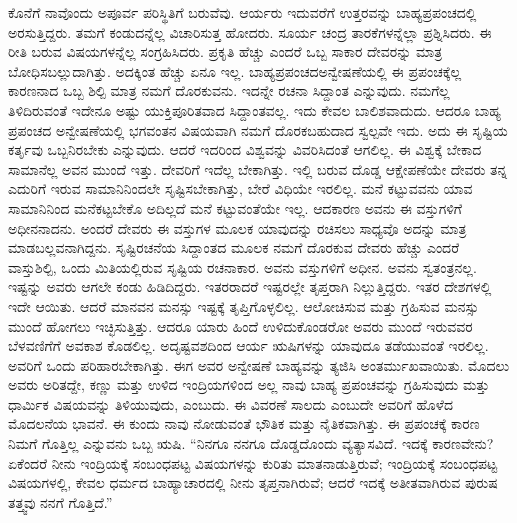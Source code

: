 ಕೊನೆಗೆ ನಾವೊಂದು ಅಪೂರ್ವ ಪರಿಸ್ಥಿತಿಗೆ ಬರುವೆವು. ಆರ್ಯರು ಇದುವರೆಗೆ ಉತ್ತರವನ್ನು ಬಾಹ್ಯಪ್ರಪಂಚದಲ್ಲಿ ಅರಸುತ್ತಿದ್ದರು. ತಮಗೆ ಕಂಡುದನ್ನೆಲ್ಲ ವಿಚಾರಿಸುತ್ತ ಹೋದರು. ಸೂರ್ಯ ಚಂದ್ರ ತಾರಕೆಗಳನ್ನೆಲ್ಲಾ ಪ್ರಶ್ನಿಸಿದರು. ಈ ರೀತಿ ಬರುವ ವಿಷಯಗಳನ್ನೆಲ್ಲ ಸಂಗ್ರಹಿಸಿದರು. ಪ್ರಕೃತಿ ಹೆಚ್ಚು ಎಂದರೆ ಒಬ್ಬ ಸಾಕಾರ ದೇವರನ್ನು ಮಾತ್ರ ಬೋಧಿಸಬಲ್ಲುದಾಗಿತ್ತು. ಅದಕ್ಕಿಂತ ಹೆಚ್ಚು ಏನೂ ಇಲ್ಲ. ಬಾಹ್ಯಪ್ರಪಂಚದ\break ಅನ್ವೇಷಣೆಯಲ್ಲಿ ಈ ಪ್ರಪಂಚಕ್ಕೆಲ್ಲ ಕಾರಣನಾದ ಒಬ್ಬ ಶಿಲ್ಪಿ ಮಾತ್ರ ನಮಗೆ ದೊರಕುವನು. ಇದನ್ನೇ ರಚನಾ ಸಿದ್ದಾಂತ ಎನ್ನುವುದು. ನಮಗೆಲ್ಲ ತಿಳಿದಿರುವಂತೆ ಇದೇನೂ ಅಷ್ಟು ಯುಕ್ತಿಪೂರಿತವಾದ ಸಿದ್ದಾಂತವಲ್ಲ. ಇದು ಕೇವಲ ಬಾಲಿಶವಾದುದು. ಆದರೂ ಬಾಹ್ಯ ಪ್ರಪಂಚದ ಅನ್ವೇಷಣೆಯಲ್ಲಿ ಭಗವಂತನ ವಿಷಯವಾಗಿ ನಮಗೆ ದೊರಕಬಹುದಾದ ಸ್ವಲ್ಪವೇ ಇದು. ಅದು ಈ ಸೃಷ್ಟಿಯ ಕರ್ತೃವು ಒಬ್ಬನಿರಬೇಕು ಎನ್ನುವುದು. ಆದರೆ ಇದರಿಂದ ವಿಶ್ವವನ್ನು ವಿವರಿಸಿದಂತೆ ಆಗಲಿಲ್ಲ. ಈ ವಿಶ್ವಕ್ಕೆ ಬೇಕಾದ ಸಾಮಾನೆಲ್ಲ ಅವನ ಮುಂದೆ ಇತ್ತು. ದೇವರಿಗೆ ಇದೆಲ್ಲ ಬೇಕಾಗಿತ್ತು. ಇಲ್ಲಿ ಬರುವ ದೊಡ್ಡ ಆಕ್ಷೇಪಣೆಯೇ ದೇವರು ತನ್ನ ಎದುರಿಗೆ ಇರುವ ಸಾಮಾನಿನಿಂದಲೇ ಸೃಷ್ಟಿಸಬೇಕಾಗಿತ್ತು, ಬೇರೆ ವಿಧಿಯೇ ಇರಲಿಲ್ಲ. ಮನೆ ಕಟ್ಟುವವನು ಯಾವ ಸಾಮಾನಿನಿಂದ ಮನೆಕಟ್ಟಬೇಕೊ ಅದಿಲ್ಲದೆ ಮನೆ ಕಟ್ಟುವಂತೆಯೇ ಇಲ್ಲ. ಆದಕಾರಣ ಅವನು ಈ ವಸ್ತುಗಳಿಗೆ ಅಧೀನನಾದನು. ಅಂದರೆ ದೇವರು ಈ ವಸ್ತುಗಳ ಮೂಲಕ ಯಾವುದನ್ನು ರಚಿಸಲು ಸಾಧ್ಯವೊ ಅದನ್ನು ಮಾತ್ರ ಮಾಡಬಲ್ಲವನಾಗಿದ್ದನು. ಸೃಷ್ಟಿರಚನೆಯ ಸಿದ್ದಾಂತದ ಮೂಲಕ ನಮಗೆ ದೊರಕುವ ದೇವರು ಹೆಚ್ಚು ಎಂದರೆ ವಾಸ್ತುಶಿಲ್ಪಿ, ಒಂದು ಮಿತಿಯಲ್ಲಿರುವ ಸೃಷ್ಟಿಯ ರಚನಾಕಾರ. ಅವನು ವಸ್ತುಗಳಿಗೆ ಅಧೀನ. ಅವನು ಸ್ವತಂತ್ರನಲ್ಲ. ಇಷ್ಟನ್ನು ಅವರು ಆಗಲೇ ಕಂಡು ಹಿಡಿದಿದ್ದರು. ಇತರರಾದರೆ ಇಷ್ಟರಲ್ಲೇ ತೃಪ್ತರಾಗಿ ನಿಲ್ಲುತ್ತಿದ್ದರು. ಇತರ ದೇಶಗಳಲ್ಲಿ ಇದೇ ಆಯಿತು. ಆದರೆ ಮಾನವನ ಮನಸ್ಸು ಇಷ್ಟಕ್ಕೆ ತೃಪ್ತಿಗೊಳ್ಳಲಿಲ್ಲ. ಆಲೋಚಿಸುವ ಮತ್ತು ಗ್ರಹಿಸುವ ಮನಸ್ಸು ಮುಂದೆ ಹೋಗಲು ಇಚ್ಛಿಸುತ್ತಿತ್ತು. ಆದರೂ ಯಾರು ಹಿಂದೆ ಉಳಿದುಕೊಂಡರೋ ಅವರು ಮುಂದೆ ಇರುವವರ ಬೆಳವಣಿಗೆಗೆ ಅವಕಾಶ ಕೊಡಲಿಲ್ಲ. ಅದೃಷ್ಟವಶದಿಂದ ಆರ್ಯ ಋಷಿಗಳನ್ನು ಯಾವುದೂ ತಡೆಯುವಂತೆ ಇರಲಿಲ್ಲ. ಅವರಿಗೆ ಒಂದು ಪರಿಹಾರಬೇಕಾಗಿತ್ತು. ಈಗ ಅವರ ಅನ್ವೇಷಣೆ ಬಾಹ್ಯವನ್ನು ತ್ಯಜಿಸಿ ಅಂತರ್ಮುಖವಾಯಿತು. ಮೊದಲು ಅವರು ಅರಿತದ್ದೇ, ಕಣ್ಣು ಮತ್ತು ಉಳಿದ ಇಂದ್ರಿಯಗಳಿಂದ ಅಲ್ಲ ನಾವು ಬಾಹ್ಯ ಪ್ರಪಂಚವನ್ನು ಗ್ರಹಿಸುವುದು ಮತ್ತು ಧಾರ್ಮಿಕ ವಿಷಯವನ್ನು ತಿಳಿಯುವುದು, ಎಂಬುದು. ಈ ವಿವರಣೆ ಸಾಲದು ಎಂಬುದೇ ಅವರಿಗೆ ಹೊಳೆದ ಮೊದಲನೆಯ ಭಾವನೆ. ಈ ಕುಂದು ನಾವು ನೋಡುವಂತೆ ಭೌತಿಕ ಮತ್ತು ನೈತಿಕವಾಗಿತ್ತು. ಈ ಪ್ರಪಂಚಕ್ಕೆ ಕಾರಣ ನಿಮಗೆ ಗೊತ್ತಿಲ್ಲ ಎನ್ನುವನು ಒಬ್ಬ ಋಷಿ. “ನಿನಗೂ ನನಗೂ ದೊಡ್ಡದೊಂದು ವ್ಯತ್ಯಾಸವಿದೆ. ಇದಕ್ಕೆ ಕಾರಣವೇನು? ಏಕೆಂದರೆ ನೀನು ಇಂದ್ರಿಯಕ್ಕೆ ಸಂಬಂಧಪಟ್ಟ ವಿಷಯಗಳನ್ನು ಕುರಿತು ಮಾತನಾಡುತ್ತಿರುವೆ; ಇಂದ್ರಿಯಕ್ಕೆ ಸಂಬಂಧಪಟ್ಟ ವಿಷಯಗಳಲ್ಲಿ, ಕೇವಲ ಧರ್ಮದ ಬಾಹ್ಯಾಚಾರದಲ್ಲಿ ನೀನು ತೃಪ್ತನಾಗಿರುವೆ; ಆದರೆ ಇದಕ್ಕೆ ಅತೀತವಾಗಿರುವ ಪುರುಷ ತತ್ತ್ವವು ನನಗೆ ಗೊತ್ತಿದೆ.”

